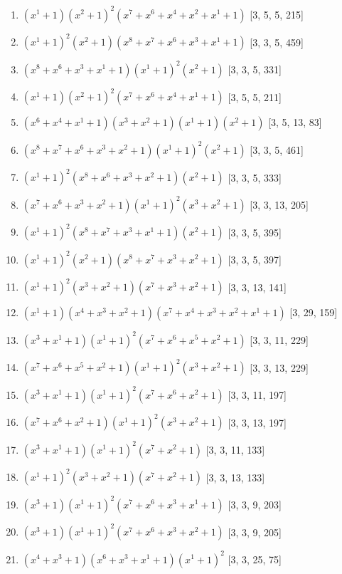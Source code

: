 \documentclass[10pt,twocolumn]{article}
\begin{document}
\begin{enumerate}
\item $(x^{1} + 1)(x^{2} + 1)^{2}(x^{7} + x^{6} + x^{4} + x^{2} + x^{1} + 1)$  [3, 5, 5, 215]
\item $(x^{1} + 1)^{2}(x^{2} + 1)(x^{8} + x^{7} + x^{6} + x^{3} + x^{1} + 1)$  [3, 3, 5, 459]
\item $(x^{8} + x^{6} + x^{3} + x^{1} + 1)(x^{1} + 1)^{2}(x^{2} + 1)$  [3, 3, 5, 331]
\item $(x^{1} + 1)(x^{2} + 1)^{2}(x^{7} + x^{6} + x^{4} + x^{1} + 1)$  [3, 5, 5, 211]
\item $(x^{6} + x^{4} + x^{1} + 1)(x^{3} + x^{2} + 1)(x^{1} + 1)(x^{2} + 1)$  [3, 5, 13, 83]
\item $(x^{8} + x^{7} + x^{6} + x^{3} + x^{2} + 1)(x^{1} + 1)^{2}(x^{2} + 1)$  [3, 3, 5, 461]
\item $(x^{1} + 1)^{2}(x^{8} + x^{6} + x^{3} + x^{2} + 1)(x^{2} + 1)$  [3, 3, 5, 333]
\item $(x^{7} + x^{6} + x^{3} + x^{2} + 1)(x^{1} + 1)^{2}(x^{3} + x^{2} + 1)$  [3, 3, 13, 205]
\item $(x^{1} + 1)^{2}(x^{8} + x^{7} + x^{3} + x^{1} + 1)(x^{2} + 1)$  [3, 3, 5, 395]
\item $(x^{1} + 1)^{2}(x^{2} + 1)(x^{8} + x^{7} + x^{3} + x^{2} + 1)$  [3, 3, 5, 397]
\item $(x^{1} + 1)^{2}(x^{3} + x^{2} + 1)(x^{7} + x^{3} + x^{2} + 1)$  [3, 3, 13, 141]
\item $(x^{1} + 1)(x^{4} + x^{3} + x^{2} + 1)(x^{7} + x^{4} + x^{3} + x^{2} + x^{1} + 1)$  [3, 29, 159]
\item $(x^{3} + x^{1} + 1)(x^{1} + 1)^{2}(x^{7} + x^{6} + x^{5} + x^{2} + 1)$  [3, 3, 11, 229]
\item $(x^{7} + x^{6} + x^{5} + x^{2} + 1)(x^{1} + 1)^{2}(x^{3} + x^{2} + 1)$  [3, 3, 13, 229]
\item $(x^{3} + x^{1} + 1)(x^{1} + 1)^{2}(x^{7} + x^{6} + x^{2} + 1)$  [3, 3, 11, 197]
\item $(x^{7} + x^{6} + x^{2} + 1)(x^{1} + 1)^{2}(x^{3} + x^{2} + 1)$  [3, 3, 13, 197]
\item $(x^{3} + x^{1} + 1)(x^{1} + 1)^{2}(x^{7} + x^{2} + 1)$  [3, 3, 11, 133]
\item $(x^{1} + 1)^{2}(x^{3} + x^{2} + 1)(x^{7} + x^{2} + 1)$  [3, 3, 13, 133]
\item $(x^{3} + 1)(x^{1} + 1)^{2}(x^{7} + x^{6} + x^{3} + x^{1} + 1)$  [3, 3, 9, 203]
\item $(x^{3} + 1)(x^{1} + 1)^{2}(x^{7} + x^{6} + x^{3} + x^{2} + 1)$  [3, 3, 9, 205]
\item $(x^{4} + x^{3} + 1)(x^{6} + x^{3} + x^{1} + 1)(x^{1} + 1)^{2}$  [3, 3, 25, 75]

\end{enumerate}
\end{document}
